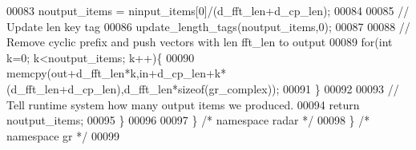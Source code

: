 \begin{DoxyCode}
00083         noutput\_items = ninput\_items[0]/(d_fft_len+d_cp_len);
00084         
00085         \textcolor{comment}{// Update len key tag}
00086         update\_length\_tags(noutput\_items,0);
00087         
00088         \textcolor{comment}{// Remove cyclic prefix and push vectors with len fft\_len to output}
00089         \textcolor{keywordflow}{for}(\textcolor{keywordtype}{int} k=0; k<noutput\_items; k++)\{
00090             memcpy(out+d_fft_len*k,in+d_cp_len+k*(d_fft_len+d_cp_len),d_fft_len*\textcolor{keyword}{sizeof}(gr\_complex));
00091         \}
00092 
00093         \textcolor{comment}{// Tell runtime system how many output items we produced.}
00094         \textcolor{keywordflow}{return} noutput\_items;
00095     \}
00096 
00097   \} \textcolor{comment}{/* namespace radar */}
00098 \} \textcolor{comment}{/* namespace gr */}
00099 
\end{DoxyCode}
